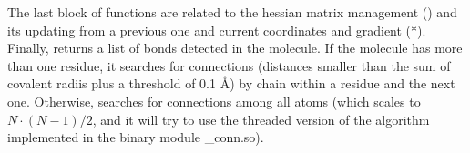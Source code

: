 The last block of functions are related to the hessian matrix management () and its updating from a previous one and current coordinates and gradient (*).\\
Finally,  returns a list of bonds detected in the molecule. If the molecule has more than one residue, it searches for connections (distances smaller than the sum of covalent radiis plus a threshold of 0.1 Å) by chain within a residue and the next one. Otherwise, searches for connections among all atoms (which scales to $N \cdot (N-1)/2$, and it will try to use the threaded version of the algorithm implemented in the binary module \_conn.so).
\footnotesize
